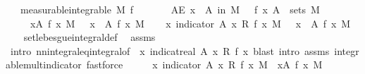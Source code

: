 \begin{isabellebody}
\ \ \ {\isacharbrackleft}{\kern0pt}measurable{\isacharbrackright}{\kern0pt}{\isacharcolon}{\kern0pt}{\isachardoublequoteopen}integrable\ M\ f{\isachardoublequoteclose}\isanewline
\ \ \ \ \ \ \ {\isachardoublequoteopen}AE\ x\ {\isasymin}\ A\ in\ M{\isachardot}{\kern0pt}\ {}\ {\isasymle}\ f\ x{\isachardoublequoteclose}\ {\isachardoublequoteopen}A\ {\isasymin}\ sets\ M{\isachardoublequoteclose}\isanewline
\ \ \ \ \ {\isachardoublequoteopen}{\isacharparenleft}{\kern0pt}{\isasymintegral}\isactrlsup {\isacharplus}{\kern0pt}x{\isasymin}A{\isachardot}{\kern0pt}\ f\ x\ {\isasympartial}M{\isacharparenright}{\kern0pt}\ {\isacharequal}{\kern0pt}\ {\isacharparenleft}{\kern0pt}{\isasymintegral}\ x\ {\isasymin}\ A{\isachardot}{\kern0pt}\ f\ x\ {\isasympartial}M{\isacharparenright}{\kern0pt}{\isachardoublequoteclose}\isanewline
%
\isadelimproof
%
\endisadelimproof
%
\isatagproof
{}\isamarkupfalse%
{\isacharminus}{\kern0pt}\isanewline
\ \ \isamarkupfalse%
\ {\isachardoublequoteopen}{\isacharparenleft}{\kern0pt}{\isasymintegral}\isactrlsup {\isacharplus}{\kern0pt}x{\isachardot}{\kern0pt}\ indicator\ A\ x\ {\isacharasterisk}{\kern0pt}\isactrlsub R\ f\ x\ {\isasympartial}M{\isacharparenright}{\kern0pt}\ {\isacharequal}{\kern0pt}\ {\isacharparenleft}{\kern0pt}{\isasymintegral}\ x\ {\isasymin}\ A{\isachardot}{\kern0pt}\ f\ x\ {\isasympartial}M{\isacharparenright}{\kern0pt}{\isachardoublequoteclose}\isanewline
\ \ \isamarkupfalse%
\ set{\isacharunderscore}{\kern0pt}lebesgue{\isacharunderscore}{\kern0pt}integral{\isacharunderscore}{\kern0pt}def\ \isamarkupfalse%
\ assms{\isacharparenleft}{\kern0pt}{}{\isacharparenright}{\kern0pt}\ \isamarkupfalse%
\ {\isacharparenleft}{\kern0pt}intro\ nn{\isacharunderscore}{\kern0pt}integral{\isacharunderscore}{\kern0pt}eq{\isacharunderscore}{\kern0pt}integral{\isacharbrackleft}{\kern0pt}of\ {\isacharunderscore}{\kern0pt}\ {\isachardoublequoteopen}{\isasymlambda}x{\isachardot}{\kern0pt}\ indicat{\isacharunderscore}{\kern0pt}real\ A\ x\ {\isacharasterisk}{\kern0pt}\isactrlsub R\ f\ x{\isachardoublequoteclose}{\isacharbrackright}{\kern0pt}{\isacharcomma}{\kern0pt}\ blast\ intro{\isacharcolon}{\kern0pt}\ assms\ integrable{\isacharunderscore}{\kern0pt}mult{\isacharunderscore}{\kern0pt}indicator{\isacharcomma}{\kern0pt}\ fastforce{\isacharparenright}{\kern0pt}\isanewline
\ \ \isamarkupfalse%
\ \isamarkupfalse%
\ {\isachardoublequoteopen}{\isacharparenleft}{\kern0pt}{\isasymintegral}\isactrlsup {\isacharplus}{\kern0pt}x{\isachardot}{\kern0pt}\ indicator\ A\ x\ {\isacharasterisk}{\kern0pt}\isactrlsub R\ f\ x\ {\isasympartial}M{\isacharparenright}{\kern0pt}\ {\isacharequal}{\kern0pt}\ {\isacharparenleft}{\kern0pt}{\isasymintegral}\isactrlsup {\isacharplus}{\kern0pt}x{\isasymin}A{\isachardot}{\kern0pt}\ f\ x\ {\isasympartial}M{\isacharparenright}{\kern0pt}{\isachardoublequoteclose}\ \ \isamarkupfalse%

\end{isabellebody}
